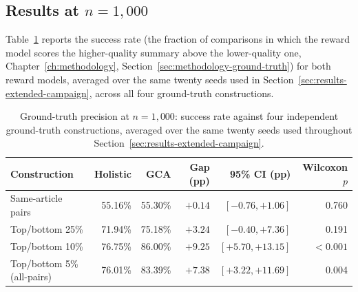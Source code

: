 \subsection{Results at \texorpdfstring{$n=1{,}000$}{n=1,000}}
\label{sec:results-gt-1000}

Table~\ref{tab:gt-1000} reports the success rate (the fraction of
comparisons in which the reward model scores the higher-quality summary
above the lower-quality one, Chapter~\ref{ch:methodology},
Section~\ref{sec:methodology-ground-truth})
for both reward models, averaged over the same twenty seeds used in
Section~\ref{sec:results-extended-campaign}, across all four ground-truth
constructions.

\begin{table}[htbp]
\centering
\caption[Ground-truth precision at $n=1{,}000$, four constructions]{Ground-truth precision at $n=1{,}000$: success rate against four
independent ground-truth constructions, averaged over the same twenty seeds
used throughout Section~\ref{sec:results-extended-campaign}.}
\label{tab:gt-1000}
\small
\setlength{\tabcolsep}{4.5pt}
\begin{tabular}{lrrrrr}
\toprule
Construction & Holistic & GCA & Gap (pp) & 95\% CI (pp) & Wilcoxon $p$ \\
\midrule
Same-article pairs        & 55.16\% & 55.30\% & $+0.14$ & $[-0.76,+1.06]$ & 0.760 \\
Top/bottom 25\%           & 71.94\% & 75.18\% & $+3.24$ & $[-0.40,+7.36]$ & 0.191 \\
Top/bottom 10\%           & 76.75\% & 86.00\% & $+9.25$ & $[+5.70,+13.15]$ & $<0.001$ \\
Top/bottom 5\% (all-pairs) & 76.01\% & 83.39\% & $+7.38$ & $[+3.22,+11.69]$ & 0.004 \\
\bottomrule
\end{tabular}
\end{table}


